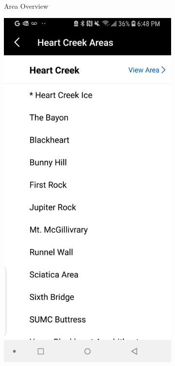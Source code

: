 \documentclass[10pt]{article}
\begin{document}
\begin{figure}[!h]
\begin{subfigure}[b]{0.3\textwidth}
      \caption{Area Overview}
      \label{fig:area_overview}
  \end{subfigure}
  \hfill
  \begin{subfigure}[b]{0.3\textwidth}
      \centering
      \includegraphics[width=\textwidth]{mp_hear_creek_toc.jpg}

\end{subfigure}
\end{figure}
\end{document}
